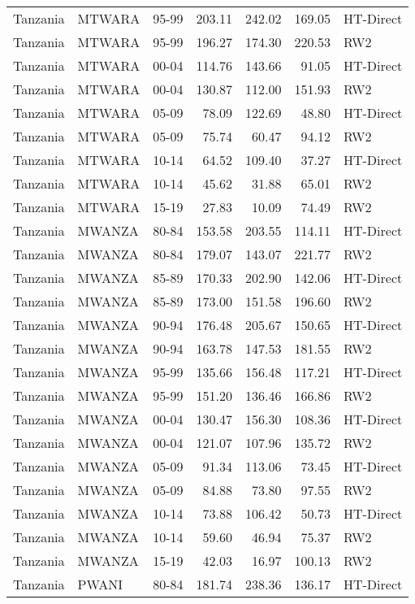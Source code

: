 \begin{longtable}{lllrrrl}
  Tanzania & MTWARA & 95-99 & 203.11 & 242.02 & 169.05 & HT-Direct \\ 
  Tanzania & MTWARA & 95-99 & 196.27 & 174.30 & 220.53 & RW2 \\ 
  Tanzania & MTWARA & 00-04 & 114.76 & 143.66 & 91.05 & HT-Direct \\ 
  Tanzania & MTWARA & 00-04 & 130.87 & 112.00 & 151.93 & RW2 \\ 
  Tanzania & MTWARA & 05-09 & 78.09 & 122.69 & 48.80 & HT-Direct \\ 
  Tanzania & MTWARA & 05-09 & 75.74 & 60.47 & 94.12 & RW2 \\ 
  Tanzania & MTWARA & 10-14 & 64.52 & 109.40 & 37.27 & HT-Direct \\ 
  Tanzania & MTWARA & 10-14 & 45.62 & 31.88 & 65.01 & RW2 \\ 
  Tanzania & MTWARA & 15-19 & 27.83 & 10.09 & 74.49 & RW2 \\ 
  Tanzania & MWANZA & 80-84 & 153.58 & 203.55 & 114.11 & HT-Direct \\ 
  Tanzania & MWANZA & 80-84 & 179.07 & 143.07 & 221.77 & RW2 \\ 
  Tanzania & MWANZA & 85-89 & 170.33 & 202.90 & 142.06 & HT-Direct \\ 
  Tanzania & MWANZA & 85-89 & 173.00 & 151.58 & 196.60 & RW2 \\ 
  Tanzania & MWANZA & 90-94 & 176.48 & 205.67 & 150.65 & HT-Direct \\ 
  Tanzania & MWANZA & 90-94 & 163.78 & 147.53 & 181.55 & RW2 \\ 
  Tanzania & MWANZA & 95-99 & 135.66 & 156.48 & 117.21 & HT-Direct \\ 
  Tanzania & MWANZA & 95-99 & 151.20 & 136.46 & 166.86 & RW2 \\ 
  Tanzania & MWANZA & 00-04 & 130.47 & 156.30 & 108.36 & HT-Direct \\ 
  Tanzania & MWANZA & 00-04 & 121.07 & 107.96 & 135.72 & RW2 \\ 
  Tanzania & MWANZA & 05-09 & 91.34 & 113.06 & 73.45 & HT-Direct \\ 
  Tanzania & MWANZA & 05-09 & 84.88 & 73.80 & 97.55 & RW2 \\ 
  Tanzania & MWANZA & 10-14 & 73.88 & 106.42 & 50.73 & HT-Direct \\ 
  Tanzania & MWANZA & 10-14 & 59.60 & 46.94 & 75.37 & RW2 \\ 
  Tanzania & MWANZA & 15-19 & 42.03 & 16.97 & 100.13 & RW2 \\ 
  Tanzania & PWANI & 80-84 & 181.74 & 238.36 & 136.17 & HT-Direct \\ 

\end{longtable}
